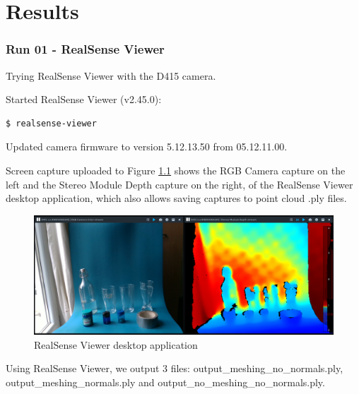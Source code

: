 \chapter{Results} %
\label{Appendix-results} %



\subsection{Run 01 - RealSense Viewer}
\label{app_res:01}

Trying RealSense Viewer with the D415 camera.

Started RealSense Viewer (v2.45.0): 
\begin{verbatim}
$ realsense-viewer    
\end{verbatim}
Updated camera firmware to version 5.12.13.50 from 05.12.11.00.  

Screen capture uploaded to 
Figure \ref{fig:RealSenseViewer2} shows the RGB Camera capture on the left and the Stereo Module Depth capture on the right, of the RealSense Viewer desktop application, which also allows saving captures to point cloud .ply files.

\begin{figure}[h!]
\centering
\includegraphics[width=\textwidth]{Figures/RealSenseViewer2.png}
\caption{RealSense Viewer desktop application}
\label{fig:RealSenseViewer2}
\end{figure}
Using RealSense Viewer, we output 3 files: output\_meshing\_no\_normals.ply, output\_meshing\_normals.ply and output\_no\_meshing\_no\_normals.ply.

